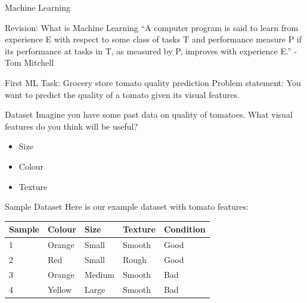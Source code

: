 \documentclass[usenames,dvipsnames]{beamer}
\begin{document}
\begin{frame}{Machine Learning}
\end{frame}

\begin{frame}{Revision: What is Machine Learning}
``A computer program is said to learn from
experience E with respect to some class of tasks T
and performance measure P if its performance at
tasks in T, as measured by P, improves with
experience E.'' - Tom Mitchell
\end{frame}

\begin{frame}{First ML Task: Grocery store tomato quality prediction}
Problem statement: You want to predict the quality of a tomato given its visual features.
\end{frame}

\begin{frame}{Dataset}
Imagine you have some past data on quality of tomatoes. What visual features do you think will be useful?

\begin{itemize}
	\item \pause Size
	\item \pause Colour
	\item \pause Texture
\end{itemize}
\end{frame}
  
\begin{frame}{Sample Dataset}
Here is our example dataset with tomato features: 

\begin{table}[]
	\begin{tabular}{|l|l|l|l||l|}
		\hline 
		\textbf{Sample} & \textbf{Colour} & \textbf{Size} & \textbf{Texture} & \textbf{Condition} \\ \hline 
		1      & Orange & Small & Smooth  & Good      \\
		2      & Red    & Small  & Rough  & Good \\
		3      & Orange & Medium & Smooth & Bad \\
		4      & Yellow & Large  & Smooth & Bad \\ \hline          
	\end{tabular}
\end{table}
\end{frame}
\end{document}
